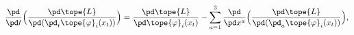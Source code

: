 \begin{equation*}
\frac{\pd}{\pd t}\Bigl(
		\frac{\pd\tope{L}}{\pd(\pd_t\tope{\varphi}_i(x_t) )}
		 \Bigr)
=
\frac{\pd\tope{L}}{\pd \tope{\varphi}_i(x_t)}
-
\sum_{a=1}^{3}
\frac{\pd}{\pd x^a}\Bigl(
		\frac{\pd\tope{L}}{\pd(\pd_a\tope{\varphi}_i(x_t) )}
		 \Bigr) ,
	\end{equation*}

